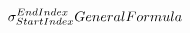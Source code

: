 \documentclass[preview]{standalone}
\begin{document}
\begin{align*}
\sigma_{Start \space Index}^{End \space Index}{General \space Formula}
\end{align*}
\end{document}
